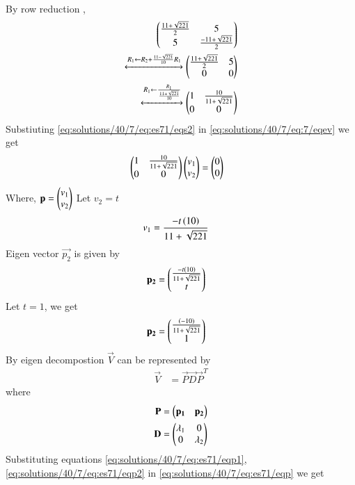 \begin{enumerate}
\begin{align}
\end{align}
By row reduction , 
\begin{align}
     \begin{pmatrix}\frac{11+\sqrt{221}}{2} & 5 \\5 & \frac{-11+\sqrt{221}}{2}\end{pmatrix}
\\
    \xleftrightarrow{R_1\leftarrow R_2+ \frac{11-\sqrt{221}}{10}R_1}
     \begin{pmatrix}\frac{11+\sqrt{221}}{2} &5\\ 0& 0\end{pmatrix}\\  
 \xleftrightarrow{R_1\leftarrow
 \frac{R_1}{\frac{11+\sqrt{221}}{10}}}
    \begin{pmatrix}1 & \frac{10}{11+\sqrt{221}} \\ 0& 0\end{pmatrix}
    \label{eq:solutions/40/7/eq:es71/eqs2}
\end{align} 
Substiuting \eqref{eq:solutions/40/7/eq:es71/eqs2} in \eqref{eq:solutions/40/7/eq:7/eqev} we get 
\begin{align}
    &\begin{pmatrix}1 & \frac{10}{11+\sqrt{221}} \\0 & 0\end{pmatrix}\begin{pmatrix}v_1 \\ v_2\end{pmatrix}=\begin{pmatrix}0 \\ 0\end{pmatrix}
\end{align}
Where, $\mathbf{p}=\begin{pmatrix}v_1\\v_2\end{pmatrix}$
Let $v_2=t$
\begin{align}
    v_1&=\frac{-t\left(10\right)}{11+\sqrt{221}}
\end{align}
Eigen vector $\vec{p_2}$ is given by
\begin{align}
        \mathbf{p_2}&=\begin{pmatrix}\frac{-t\left(10\right)}{11+\sqrt{221}} \\ t\end{pmatrix}
\end{align}
Let $t=1$, we get 
\begin{align}
    \mathbf{p_2}&=\begin{pmatrix}\frac{\left(-10\right)}{11+\sqrt{221}} \\1 \end{pmatrix}\label{eq:solutions/40/7/eq:es71/eqp2}
\end{align}
By eigen decompostion $\vec{V}$ can be represented by
\begin{align}
    \vec{V}&=\vec{P}\vec{D}\vec{P}^T\label{eq:solutions/40/7/eq:es71/eqsubs}
\end{align}
where 
\begin{align}
        \mathbf{P}&=\begin{pmatrix}\mathbf{p_1} & \mathbf{p_2}\end{pmatrix}\label{eq:solutions/40/7/eq:es71/eqp}\\
    \mathbf{D}&=\begin{pmatrix}\lambda_1 & 0 \\0 & \lambda_2\end{pmatrix}\label{eq:solutions/40/7/eq:es71/eqD}
\end{align}
Substituting equations \ref{eq:solutions/40/7/eq:es71/eqp1}, \ref{eq:solutions/40/7/eq:es71/eqp2} in \eqref{eq:solutions/40/7/eq:es71/eqp} we get 

\end{enumerate}

